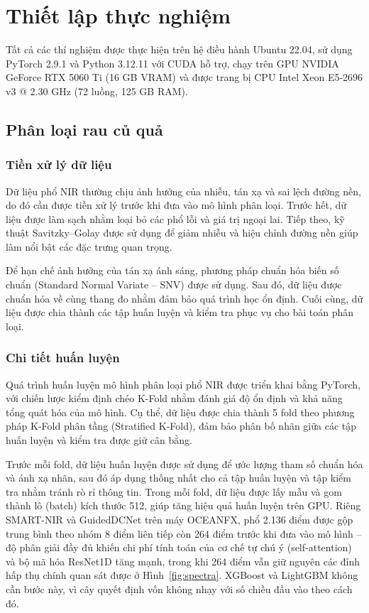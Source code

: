 \documentclass[10pt,twocolumn,twoside]{article}
\begin{document}
\section{Thiết lập thực nghiệm}

Tất cả các thí nghiệm được thực hiện trên hệ điều hành Ubuntu 22.04, sử dụng
PyTorch 2.9.1 và Python 3.12.11 với CUDA hỗ trợ, chạy trên GPU NVIDIA GeForce
RTX 5060 Ti (16 GB VRAM) và được trang bị CPU Intel\textregistered{}
Xeon\textregistered{} E5-2696 v3 @ 2.30 GHz (72 luồng, 125 GB RAM).

\subsection{Phân loại rau củ quả}

\subsubsection{Tiền xử lý dữ liệu}

Dữ liệu phổ NIR thường chịu ảnh hưởng của nhiễu, tán xạ và sai lệch đường
nền, do đó cần được tiền xử lý trước khi đưa vào mô hình phân loại. Trước
hết, dữ liệu được làm sạch nhằm loại bỏ các phổ lỗi và giá trị ngoại lai.
Tiếp theo, kỹ thuật Savitzky--Golay được sử dụng để giảm nhiễu và hiệu chỉnh
đường nền giúp làm nổi bật các đặc trưng quan trọng.

Để hạn chế ảnh hưởng của tán xạ ánh sáng, phương pháp chuẩn hóa biến số
chuẩn (Standard Normal Variate -- SNV) được sử dụng. Sau đó, dữ liệu được
chuẩn hóa về cùng thang đo nhằm đảm bảo quá trình học ổn định. Cuối cùng, dữ
liệu được chia thành các tập huấn luyện và kiểm tra phục vụ cho bài toán
phân loại.

\subsubsection{Chi tiết huấn luyện}
\label{sec:clf-training}

Quá trình huấn luyện mô hình phân loại phổ NIR được triển khai bằng PyTorch,
với chiến lược kiểm định chéo K-Fold nhằm đánh giá độ ổn định và khả năng
tổng quát hóa của mô hình. Cụ thể, dữ liệu được chia thành 5 fold theo
phương pháp K-Fold phân tầng (Stratified K-Fold), đảm bảo phân bố nhãn giữa
các tập huấn luyện và kiểm tra được giữ cân bằng.

Trước mỗi fold, dữ liệu huấn luyện được sử dụng để ước lượng tham số chuẩn
hóa và ánh xạ nhãn, sau đó áp dụng thống nhất cho cả tập huấn luyện và tập
kiểm tra nhằm tránh rò rỉ thông tin. Trong mỗi fold, dữ liệu được lấy mẫu và
gom thành lô (batch) kích thước 512, giúp tăng hiệu quả huấn luyện trên GPU.
Riêng SMART-NIR và GuidedDCNet trên máy OCEANFX, phổ 2.136 điểm được gộp
trung bình theo nhóm 8 điểm liên tiếp còn 264 điểm trước khi đưa vào mô
hình -- độ phân giải đầy đủ khiến chi phí tính toán của cơ chế tự chú ý
(self-attention) và bộ mã hóa ResNet1D tăng mạnh, trong khi 264 điểm vẫn
giữ nguyên các đỉnh hấp thụ chính quan sát được ở Hình~\ref{fig:spectra}.
XGBoost và LightGBM không cần bước này, vì cây quyết định vốn không nhạy
với số chiều đầu vào theo cách đó.
\end{document}
